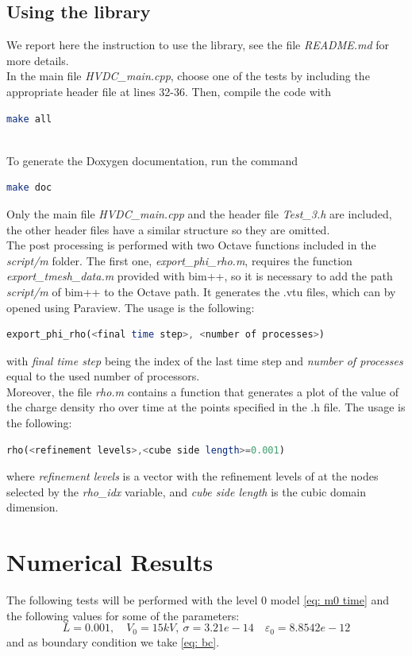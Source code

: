 \documentclass{Configuration_Files/PoliMi3i_thesis}
\let\epsilon\varepsilon
\begin{document}
\section{Using the library}
We report here the instruction to use the library, see the file \textit{README.md} for more details.
\\In the main file \textit{HVDC\_main.cpp}, choose one of the tests by including the appropriate header file at lines 32-36. Then, compile the code with 
\begin{lstlisting}[language=bash]
make all
\end{lstlisting}
\\To generate the Doxygen documentation, run the command 
\begin{lstlisting}[language=bash]
make doc
\end{lstlisting}
Only the main file \textit{HVDC\_main.cpp} and the header file \textit{Test\_3.h} are included, the other header files have a similar structure so they are omitted.
\\The post processing is performed with two Octave functions included in the \textit{script/m} folder. The first one, \textit{export\_phi\_rho.m}, requires the function \textit{export\_tmesh\_data.m} provided with bim++, so it is necessary to add the path \textit{script/m} of bim++ to the Octave path. It generates the .vtu files, which can by opened using Paraview. The usage is the following:
\begin{lstlisting}[language=octave]
export_phi_rho(<final time step>, <number of processes>)
\end{lstlisting}
with \textit{final time step} being the index of the last time step and \textit{number of processes} equal to the used number of processors. 
\\Moreover, the file \textit{rho.m} contains a function that generates a plot of the value of the charge density rho over time at the points specified in the .h file. The usage is the following:
\begin{lstlisting}[language=octave]
rho(<refinement levels>,<cube side length>=0.001)
\end{lstlisting}
where \textit{refinement levels} is a vector with the refinement levels of at the nodes selected by the \textit{rho\_idx} variable, and \textit{cube side length} is the cubic domain dimension.


\chapter{Numerical Results}
The following tests will be performed with the level 0 model \ref{eq: m0 time} and the following values for some of the parameters:
\[L=0.001,\quad V_0=15kV,\ \sigma=3.21e-14\quad \epsilon_0=8.8542e-12\]
and as boundary condition we take \ref{eq: bc}.
\end{document}
